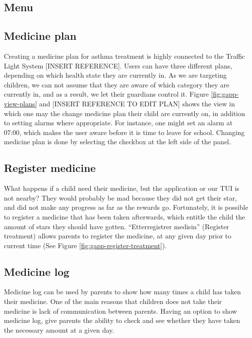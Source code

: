 \subsection{Menu}
\label{sec:description-menu}


\subsection{Medicine plan}
\label{sec:description-medicine-plan}
Creating a medicine plan for asthma treatment is highly connected to the Traffic Light System [INSERT REFERENCE].
Users can have three different plans, depending on which health state they are currently in. As we are targeting children, we can not assume that they are aware of which category they are currently in, and as a result, we let their guardians control it. Figure \ref{fig:gapp-view-plans} and [INSERT REFERENCE TO EDIT PLAN] shows the view in which one may the change medicine plan their child are currently on, in addition to setting alarms where appropriate. For instance, one might set an alarm at 07:00, which makes the user aware before it is time to leave for school. Changing medicine plan is done by selecting the checkbox at the left side of the panel.  

\subsection{Register medicine}
\label{sec:description-register-medicine}
What happens if a child need their medicine, but the application or our TUI is not nearby? They would probably be mad because they did not get their star, and did not make any progress as far as the rewards go. Fortunately, it is possible to register a medicine that has been taken afterwards, which entitle the child the amount of stars they should have gotten. ``Etterregistrer medisin'' (Register treatment) allows parents to register the medicine, at any given day prior to current time (See Figure \ref{fig:gapp-register-treatment}).  


\subsection{Medicine log}
\label{sec:description-medicine-log}
Medicine log can be used by parents to show how many times a child has taken their medicine. One of the main reasons that children does not take their medicine is lack of communication between parents. Having an option to show medicine log, give parents the ability to check and see whether they have taken the necessary amount at a given day.

